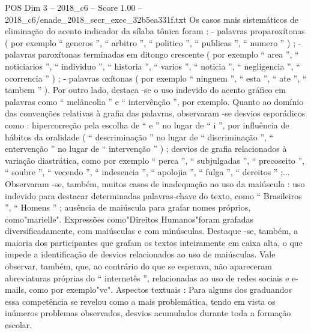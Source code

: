 \begin{textsample}{POS Dim 3 – 2018\_c6 – Score 1.00 – 2018\_c6/enade\_2018\_secr\_exec\_32b5ea331f.txt}
Os casos mais sistemáticos de eliminação do acento indicador da sílaba tônica foram : - palavras proparoxítonas ( por exemplo “ generos ”, “ arbitro ”, “ politico ”, “ publicas ”, “ numero ” ) ; - palavras paroxítonas terminadas em ditongo crescente ( por exemplo “ area ”, “ noticiarios ”, “ individuo ”, “ historia ”, “ varios ”, “ noticia ”, “ negligencia ”, “ ocorrencia ” ) ; - palavras oxítonas ( por exemplo “ ninguem ”, “ esta ”, “ ate ”, “ tambem ” ).
Por outro lado, destaca -se o uso indevido do acento gráfico em palavras como “ melâncolia ” e “ intervênção ”, por exemplo.
Quanto ao domínio das convenções relativas à grafia das palavras, observaram -se desvios esporádicos como : hipercorreção pela escolha de “ e ” no lugar de “ i ”, por influência de hábitos da oralidade ( “ descriminação ” no lugar de “ discriminação ”, “ entervenção ” no lugar de “ intervenção ” ) ; desvios de grafia relacionados à variação diastrática, como por exemplo “ perca ”, “ subjulgadas ”, “ precoseito ”, “ soubre ”, “ vecendo ”, “ indesencia ”, “ apolojia ”, “ fulga ”, “ dereitos ” ;...
Observaram -se, também, muitos casos de inadequação no uso da maiúscula : uso indevido para destacar determinadas palavras-chave do texto, como “ Brasileiros ”, “ Homens ” ; ausência de maiúscula para grafar nomes próprios, como"marielle".
Expressões como"Direitos Humanos"foram grafadas diversificadamente, com maiúsculas e com minúsculas.
Destaque -se, também, a maioria dos participantes que grafam os textos inteiramente em caixa alta, o que impede a identificação de desvios relacionados ao uso de maiúsculas.
Vale observar, também, que, ao contrário do que se esperava, não apareceram abreviaturas próprias do “ internetês ”, relacionadas ao uso de redes sociais e e-mails, como por exemplo"vc".
Aspectos textuais : Para alguns dos graduandos essa competência se revelou como a mais problemática, tendo em vista os inúmeros problemas observados, desvios acumulados durante toda a formação escolar.

\end{textsample}
